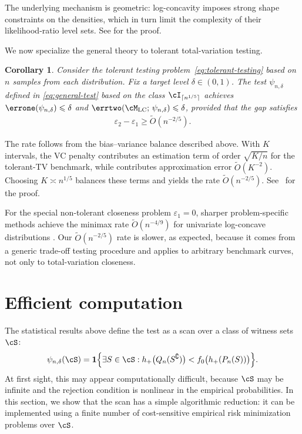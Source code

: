 \documentclass[english]{article}
\theoremstyle{plain}
\newtheorem{corollary}{Corollary}[section]
\theoremstyle{definition}
\newcommand{\fnull}{f_0}
\begin{document}
\noindent The underlying
mechanism is geometric: log-concavity imposes strong shape constraints on the
densities, which in turn limit the complexity of their likelihood-ratio level
sets. See  for the proof.
\medskip

We now specialize the general theory to tolerant total-variation testing.

\begin{corollary}\label{cor:log-concave-tolerant}
Consider the tolerant testing problem~\eqref{eq:tolerant-testing} based on
\(n\) samples from each distribution. Fix a target level \(\delta \in (0,1)\).
The test \(\psi_{n,\delta}\) defined
in \eqref{eq:general-test} based on the class \(\cI_{ \lceil n^{1/5}\rceil}\) achieves \(\errone(\psi_{n,\delta}) \leqslant \delta\) and \(\errtwo(\cM_{\mathrm{LC}};\, \psi_{n,\delta}) \leqslant \delta\), 
provided that the gap satisfies
\begin{align*}
\varepsilon_2-\varepsilon_1 \geqslant \widetilde{O}(n^{-2/5}).
\end{align*}
\end{corollary}

\noindent The rate follows from the bias--variance balance described above. With \(K\)
intervals, the VC penalty contributes an estimation term of order
\(\sqrt{K/n}\) for the tolerant-TV benchmark, while
 contributes approximation error
\(\widetilde O(K^{-2})\). Choosing \(K\asymp n^{1/5}\) balances these terms and
yields the rate \(\widetilde O(n^{-2/5})\). See~ for the proof. 
\medskip


For the special non-tolerant closeness problem \(\varepsilon_1=0\), sharper
problem-specific methods achieve the minimax rate
\(\widetilde O(n^{-4/9})\) for univariate log-concave distributions
\cite{TV_log_concave}. Our \(\widetilde O(n^{-2/5})\) rate is slower, as
expected, because it comes from a generic trade-off testing procedure and
applies to arbitrary benchmark curves, not only to total-variation closeness.


\section{Efficient computation}\label{sec:computation}

The statistical results above define the test as a scan over a class of witness
sets \(\cS\):
\begin{equation}
\label{eq:test-comp-start}
\psi_{n,\delta}(\cS)
=
\mathbf 1\Bigl\{
\exists S\in\cS:
h_+\bigl(Q_n(S^\complement)\bigr)
<
\fnull\bigl(h_+(P_n(S))\bigr)
\Bigr\}.
\end{equation}
At first sight, this may appear computationally difficult, because \(\cS\) may
be infinite and the rejection condition is nonlinear in the empirical
probabilities. In this section, we show that the scan has a simple algorithmic
reduction: it can be implemented using a finite number of cost-sensitive
empirical risk minimization problems over \(\cS\).
\end{document}
